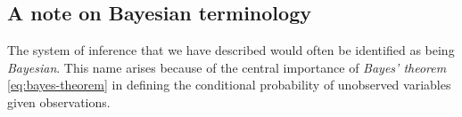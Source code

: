 
 
\subsection{A note on Bayesian terminology}






The system of inference that we have described would often be identified as being \emph{Bayesian}. This name arises because of the central importance of \emph{Bayes' theorem} \eqref{eq:bayes-theorem} in defining the conditional probability of unobserved variables given observations.

